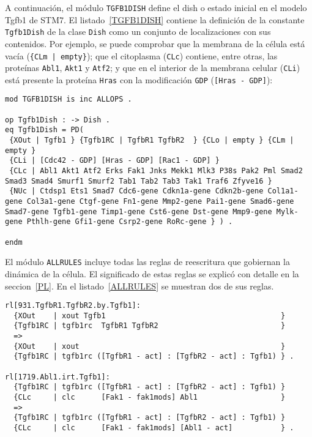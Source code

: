 A continuación, el módulo \texttt{TGFB1DISH} define el dish o estado inicial en el modelo Tgfb1 de STM7.
El listado~\ref{TGFB1DISH} contiene la definición de la constante \texttt{Tgfb1Dish} de la clase \texttt{Dish} como un conjunto de localizaciones con sus contenidos. Por ejemplo, se puede comprobar que la membrana de la célula está vacía (\verb${CLm | empty}$); que el citoplasma (\verb$CLc$) contiene, entre otras, las proteínas \texttt{Abl1}, \texttt{Akt1} y \texttt{Atf2}; y que en el interior de la membrana celular (\verb$CLi$) está presente la proteína \texttt{Hras} con la modificación \texttt{GDP} (\verb$[Hras - GDP]$):

\begin{lstlisting}[label=TGFB1DISH,language=Maude,caption={Módulo \texttt{TGFB1DISH}}]
mod TGFB1DISH is inc ALLOPS .

op Tgfb1Dish : -> Dish .
eq Tgfb1Dish = PD(    
 {XOut | Tgfb1 } {Tgfb1RC | TgfbR1 TgfbR2  } {CLo | empty } {CLm | empty } 
 {CLi | [Cdc42 - GDP] [Hras - GDP] [Rac1 - GDP] }
 {CLc | Abl1 Akt1 Atf2 Erks Fak1 Jnks Mekk1 Mlk3 P38s Pak2 Pml Smad2 Smad3 Smad4 Smurf1 Smurf2 Tab1 Tab2 Tab3 Tak1 Traf6 Zfyve16 }
 {NUc | Ctdsp1 Ets1 Smad7 Cdc6-gene Cdkn1a-gene Cdkn2b-gene Col1a1-gene Col3a1-gene Ctgf-gene Fn1-gene Mmp2-gene Pai1-gene Smad6-gene Smad7-gene Tgfb1-gene Timp1-gene Cst6-gene Dst-gene Mmp9-gene Mylk-gene Pthlh-gene Gfi1-gene Csrp2-gene RoRc-gene } ) .

endm
\end{lstlisting}
\bigskip


El módulo \texttt{ALLRULES} incluye todas las reglas de reescritura que gobiernan la dinámica de la célula.
El significado de estas reglas se explicó con detalle en la seccion~\ref{PL}.
En el listado~\ref{ALLRULES} se muestran dos de sus reglas. 

\begin{lstlisting}[label=ALLRULES,language=Maude,caption={Reglas en el módulo \texttt{ALLRULES}}]
rl[931.TgfbR1.TgfbR2.by.Tgfb1]:
  {XOut    | xout Tgfb1                                        }
  {Tgfb1RC | tgfb1rc  TgfbR1 TgfbR2                            }
  =>
  {XOut    | xout                                              }
  {Tgfb1RC | tgfb1rc ([TgfbR1 - act] : [TgfbR2 - act] : Tgfb1) } .

rl[1719.Abl1.irt.Tgfb1]:
  {Tgfb1RC | tgfb1rc ([TgfbR1 - act] : [TgfbR2 - act] : Tgfb1) }
  {CLc     | clc      [Fak1 - fak1mods] Abl1                   }
  =>
  {Tgfb1RC | tgfb1rc ([TgfbR1 - act] : [TgfbR2 - act] : Tgfb1) }
  {CLc     | clc      [Fak1 - fak1mods] [Abl1 - act]           } .
\end{lstlisting}
\bigskip


